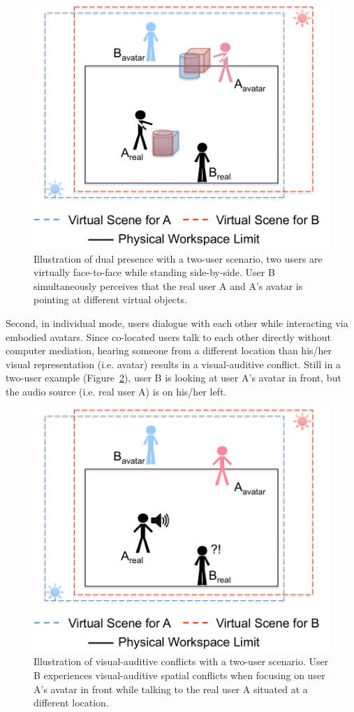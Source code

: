 \begin{figure}[htb]
  \centering
  \includegraphics[width=.7\textwidth]{figures/ch2/pc_dualpresence}
  \caption{\label{fig:2_pc_dualpresence}Illustration of dual presence with a two-user scenario, two users are virtually face-to-face while standing side-by-side. User B simultaneously perceives that the real user A and A's avatar is pointing at different virtual objects.}
\end{figure}

Second, in individual mode, users dialogue with each other while interacting via embodied avatars. Since co-located users talk to each other directly without computer mediation, hearing someone from a different location than his/her visual representation (i.e. avatar) results in a visual-auditive conflict. Still in a two-user example (Figure~\ref{fig:2_pc_visualauditive}), user B is looking at user A's avatar in front, but the audio source (i.e. real user A) is on his/her left.

\begin{figure}[htb]
  \centering
  \includegraphics[width=.7\textwidth]{figures/ch2/pc_visualauditive}
  \caption{\label{fig:2_pc_visualauditive}Illustration of visual-auditive conflicts with a two-user scenario. User B experiences visual-auditive spatial conflicts when focusing on user A's avatar in front while talking to the real user A situated at a different location.}
\end{figure}

